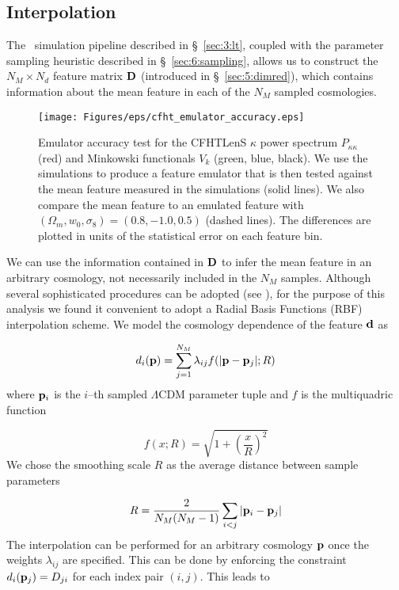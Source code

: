 \subsection{Interpolation}
The \LT\, simulation pipeline described in \S~\ref{sec:3:lt}, coupled with the parameter sampling heuristic described in \S~\ref{sec:6:sampling}, allows us to construct the $N_M\times N_d$ feature matrix $\mathbf{D}$ (introduced in \S~\ref{sec:5:dimred}), which contains information about the mean feature in each of the $N_M$ sampled cosmologies. 
%
\begin{figure}
\begin{center}
\texttt{[image: Figures/eps/cfht\_emulator\_accuracy.eps]}
\end{center}
\caption{Emulator accuracy test for the CFHTLenS $\kappa$ power spectrum $P_{\kappa\kappa}$ (red) and Minkowski functionals $V_k$ (green, blue, black). We use the  simulations to produce a feature emulator that is then tested against the mean feature measured in the  simulations (solid lines). We also compare the mean  feature to an emulated feature with $(\Omega_m,w_0,\sigma_8)=(0.8,-1.0,0.5)$ (dashed lines). The differences are plotted in units of the statistical error on each feature bin.}
\label{fig:6:interpolation}
\end{figure}
%
We can use the information contained in $\mathbf{D}$ to infer the mean feature in an arbitrary cosmology, not necessarily included in the $N_M$ samples. Although several sophisticated procedures can be adopted (see \citep{Coyote2}), for the purpose of this analysis we found it convenient to adopt a Radial Basis Functions (RBF) interpolation scheme. We model the cosmology dependence of the feature $\mathbf{d}$ as

\begin{equation}
\label{eq:6:rbf}
d_i(\mathbf{p}) = \sum_{j=1}^{N_M} \lambda_{ij}f(\vert\mathbf{p}-\mathbf{p}_j\vert;R)
\end{equation}  
%
where $\mathbf{p}_i$ is the $i$--th sampled $\Lambda$CDM parameter tuple and $f$ is the multiquadric function

\begin{equation}
\label{eq:6:multiquadric}
f(x;R) = \sqrt{1+\left(\frac{x}{R}\right)^2}
\end{equation}
%
We chose the smoothing scale $R$ as the average distance between sample parameters

\begin{equation}
\label{eq:6:scale}
R = \frac{2}{N_M(N_M-1)}\sum_{i<j}\vert\mathbf{p}_i-\mathbf{p}_j\vert
\end{equation} 
%
The interpolation can be performed for an arbitrary cosmology $\mathbf{p}$ once the weights $\lambda_{ij}$ are specified. This can be done by enforcing the constraint $d_i(\mathbf{p}_j) = D_{ji}$ for each index pair $(i,j)$. This leads to 

